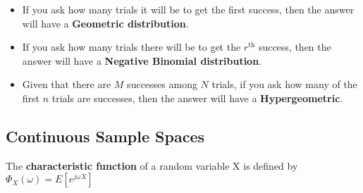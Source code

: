 \documentclass{../cheat}
\begin{document}
\begin{multicols}{3}
\begin{itemize}
		\item If you ask how many trials it will be to get the first success, then the answer will have a \textbf{Geometric distribution}.
		\item If you ask how many trials there will be to get the $r^\text{th}$ success, then the answer will have a \textbf{Negative Binomial distribution}.
		\item Given that there are $M$ successes among $N$ trials, if you ask how many of the first $n$ trials are successes, then the answer will have a \textbf{Hypergeometric}.
	\end{itemize}

	\subsection{Continuous Sample Spaces}
	The \textbf{characteristic function} of a random variable X is defined by
	$\Phi_X(\omega) = E[e^{j\omega X}]$
	

\end{multicols}
\end{document}
